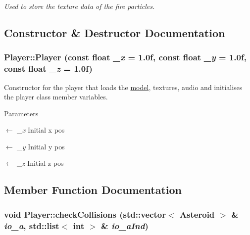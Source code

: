\begin{DoxyCompactItemize}
\begin{DoxyCompactList}\small\item\em Used to store the texture data of the fire particles. \item\end{DoxyCompactList}\end{DoxyCompactItemize}


\subsection{Constructor \& Destructor Documentation}
\hypertarget{classPlayer_a699a172ce5dd9adcf86c394872ccae86}{
\subsubsection[{Player}]{\setlength{\rightskip}{0pt plus 5cm}Player::Player (const float {\em \_\-x} = {\ttfamily 1.0f}, \/  const float {\em \_\-y} = {\ttfamily 1.0f}, \/  const float {\em \_\-z} = {\ttfamily 1.0f})}}
\label{classPlayer_a699a172ce5dd9adcf86c394872ccae86}


Constructor for the player that loads the \hyperlink{structmodel}{model}, textures, audio and initialises the player class member variables. 
\begin{DoxyParams}{Parameters}
\item[\mbox{$\leftarrow$} {\em \_\-x}]Initial x pos \item[\mbox{$\leftarrow$} {\em \_\-y}]Initial y pos \item[\mbox{$\leftarrow$} {\em \_\-z}]Initial z pos \end{DoxyParams}


\subsection{Member Function Documentation}
\hypertarget{classPlayer_aadb3a7621f71cc1be367442b11912cb5}{
\subsubsection[{checkCollisions}]{\setlength{\rightskip}{0pt plus 5cm}void Player::checkCollisions (std::vector$<$ {\bf Asteroid} $>$ \& {\em io\_\-a}, \/  std::list$<$ int $>$ \& {\em io\_\-aInd})}}
\label{classPlayer_aadb3a7621f71cc1be367442b11912cb5}


